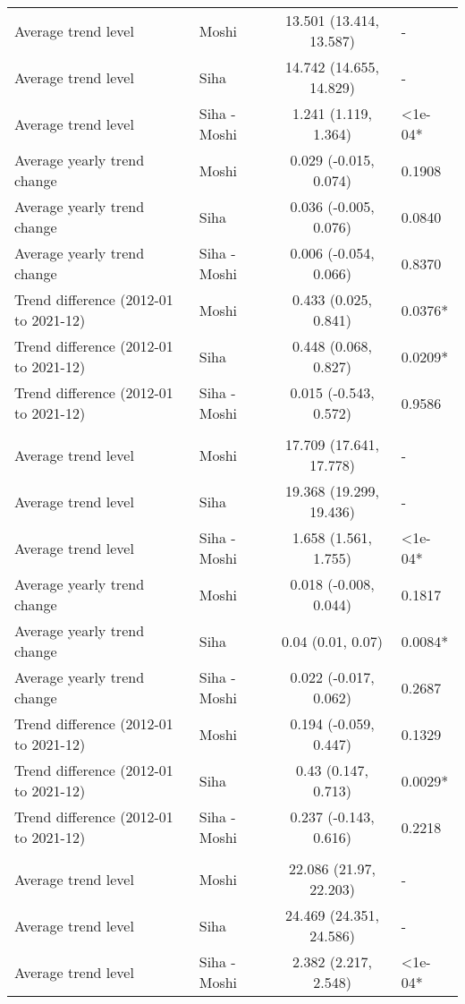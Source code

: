 \begin{longtable}{l|lcl}
\midrule\addlinespace[2.5pt]
Average trend level & Moshi & 13.501 (13.414, 13.587) & - \\ 
Average trend level & Siha & 14.742 (14.655, 14.829) & - \\ 
Average trend level & Siha - Moshi & 1.241 (1.119, 1.364) & <1e-04* \\ 
Average yearly trend change & Moshi & 0.029 (-0.015, 0.074) & 0.1908 \\ 
Average yearly trend change & Siha & 0.036 (-0.005, 0.076) & 0.0840 \\ 
Average yearly trend change & Siha - Moshi & 0.006 (-0.054, 0.066) & 0.8370 \\ 
Trend difference (2012-01 to 2021-12) & Moshi & 0.433 (0.025, 0.841) & 0.0376* \\ 
Trend difference (2012-01 to 2021-12) & Siha & 0.448 (0.068, 0.827) & 0.0209* \\ 
Trend difference (2012-01 to 2021-12) & Siha - Moshi & 0.015 (-0.543, 0.572) & 0.9586 \\ 
\midrule\addlinespace[2.5pt]
\multicolumn{4}{l}{Mean temp. (ºC)} \\[2.5pt] 
\midrule\addlinespace[2.5pt]
Average trend level & Moshi & 17.709 (17.641, 17.778) & - \\ 
Average trend level & Siha & 19.368 (19.299, 19.436) & - \\ 
Average trend level & Siha - Moshi & 1.658 (1.561, 1.755) & <1e-04* \\ 
Average yearly trend change & Moshi & 0.018 (-0.008, 0.044) & 0.1817 \\ 
Average yearly trend change & Siha & 0.04 (0.01, 0.07) & 0.0084* \\ 
Average yearly trend change & Siha - Moshi & 0.022 (-0.017, 0.062) & 0.2687 \\ 
Trend difference (2012-01 to 2021-12) & Moshi & 0.194 (-0.059, 0.447) & 0.1329 \\ 
Trend difference (2012-01 to 2021-12) & Siha & 0.43 (0.147, 0.713) & 0.0029* \\ 
Trend difference (2012-01 to 2021-12) & Siha - Moshi & 0.237 (-0.143, 0.616) & 0.2218 \\ 
\midrule\addlinespace[2.5pt]
\multicolumn{4}{l}{Max. temp. (ºC)} \\[2.5pt] 
\midrule\addlinespace[2.5pt]
Average trend level & Moshi & 22.086 (21.97, 22.203) & - \\ 
Average trend level & Siha & 24.469 (24.351, 24.586) & - \\ 
Average trend level & Siha - Moshi & 2.382 (2.217, 2.548) & <1e-04* \\ 

\end{longtable}
